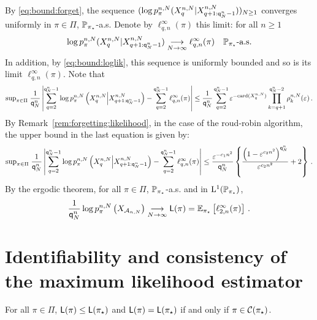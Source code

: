 By \eqref{eq:bound:forget}, the sequence $(\log p_{\pi}^{n,N}(X_{q}^{n,N}|X_{q+1:{\mathsf{q}}^{n}_{N}-1}^{n,N}))_{N\ge 1}$ converges uniformly in $\pi\in\Pi$, $\mathbb{P}_{\pi_{\star}}$-a.s. Denote by $\ell^{\infty}_{q,n}(\pi)$ this limit: for all $n\ge 1$
\[
\log p_{\pi}^{n,N}(X_{q}^{n,N}|X_{q+1:{\mathsf{q}}^{n}_{N}-1}^{n,N})\underset{N\to \infty}{\longrightarrow}\ell^{\infty}_{q,n}(\pi)\quad \mathbb{P}_{\pi_{\star}}\mbox{-a.s.}
\]
In addition, by \eqref{eq:bound:loglik}, this sequence is uniformly bounded and so is its limit $\ell^{\infty}_{q,n}(\pi)$. Note that
\[
\mathrm{sup}_{\pi\in\Pi}\;\frac{1}{{\mathsf{q}}^{n}_{N}}\left|\sum_{q=2}^{{\mathsf{q}}^{n}_{N}-1}  \log p_{\pi}^{n,N}\left(X_{q}^{n,N}\middle|X_{q+1:{\mathsf{q}}^{n}_{N}-1}^{n,N}\right) - \sum_{q=2}^{{\mathsf{q}}^{n}_{N}-1}\ell^{\infty}_{q,n}(\pi)\right| \le \frac{1}{{\mathsf{q}}^{n}_{N}}\sum_{q=2}^{{\mathsf{q}}^{n}_{N}-1}\varepsilon^{-\mathrm{card}(X^{n,N}_{q})}\prod_{k=q+1}^{{\mathsf{q}}^{n}_{N}-2}\rho^{n,N}_k(\varepsilon)\,.
\]
By Remark~\ref{rem:forgetting:likelihood}, in the case of the roud-robin algorithm, the upper bound in the last equation is given by:
\[
\mathrm{sup}_{\pi\in\Pi}\;\frac{1}{{\mathsf{q}}^{n}_{N}}\left|\sum_{q=2}^{{\mathsf{q}}^{n}_{N}-1}  \log p_{\pi}^{n,N}\left(X_{q}^{n,N}\middle|X_{q+1:{\mathsf{q}}^{n}_{N}-1}^{n,N}\right) - \sum_{q=2}^{{\mathsf{q}}^{n}_{N}-1}\ell^{\infty}_{q,n}(\pi)\right|\le\frac{\varepsilon^{- c_1n^2}}{{\mathsf{q}}^{n}_{N}}\left\{\frac{\left(1-\varepsilon^{c_2n^2}\right)^{{\mathsf{q}}^{n}_{N}}}{\varepsilon^{c_2n^2}}+2\right\}\,.
\]
By the ergodic theorem, for all $\pi\in\Pi$, $\mathbb{P}_{\pi_{\star}}$-a.s.  and in $\mathrm{L}^1(\mathbb{P}_{\pi_{\star}})$,
\[
\frac{1}{{\mathsf{q}}^{n}_{N}}\log p_{\pi}^{n,N}\left(X_{\mathcal{A}_{n,N}}\right) \underset{N\to \infty}{\longrightarrow} \mathsf{L}(\pi) = \mathbb{E}_{\pi_{\star}}\left[\ell^{\infty}_{2,n}(\pi)\right]\,.
\]

\section{Identifiability and consistency of the maximum likelihood estimator}

\begin{proposition}
\label{prop:max:likelihood}
For all $\pi\in\Pi$, $\mathsf{L}(\pi)\le \mathsf{L}(\pi_{\star})$ and $\mathsf{L}(\pi) = \mathsf{L}(\pi_{\star})$ if and only if $\pi\in \mathcal{C}(\pi_{\star})$.
\end{proposition}

